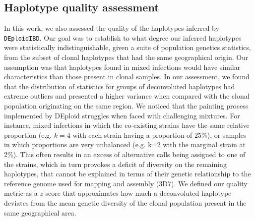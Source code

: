 \documentclass[9pt]{article}
\begin{document}
\subsection{Haplotype quality assessment}
\label{section:hap-quality}
In this work, we also assessed the quality of the haplotypes inferred by \texttt{DEploidIBD}. Our goal was to establish to what degree our inferred haplotypes were statistically indistinguishable, given a suite of population genetics statistics, from the subset of clonal haplotypes that had the same geographical origin. Our assumption was that haplotypes found in mixed infections would have similar characteristics than those present in clonal samples. In our assessment, we found that the distribution of statistics for groups of deconvoluted haplotypes had extreme outliers and presented a higher variance when compared with the clonal population originating on the same region. We noticed that the painting process implemented by DEploid struggles when faced with challenging mixtures. For instance, mixed infections in which the co-existing strains have the same relative proportion (e.g. $k=4$ with each strain having a proportion of 25\%), or samples in which proportions are very unbalanced (e.g. k=2 with the marginal strain at 2\%). This often results in an excess of alternative calls being assigned to one of the strains, which in turn provokes a deficit of diversity on the remaining haplotypes, that cannot be explained in terms of their genetic relationship to the reference genome used for mapping and assembly (3D7). We defined our quality metric as a $z$-score that approximates how much a deconvoluted haplotype deviates from the mean genetic diversity of the clonal population present in the same geographical area.
\end{document}
